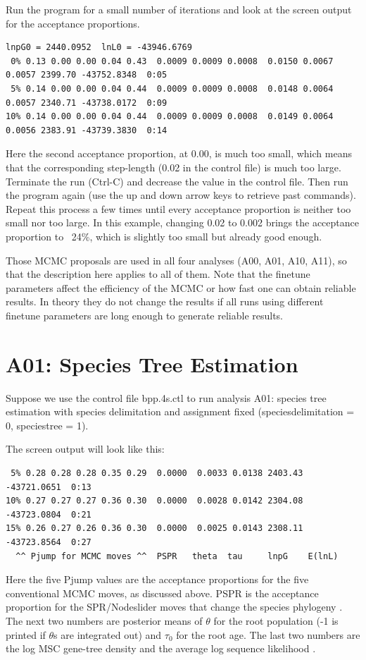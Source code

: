 \documentclass[a4paper]{book}
\numberwithin{equation}{section} \renewcommand{\baselinestretch}{0.55}
\begin{document}
Run the program for a small number of iterations and look at the
screen output for the acceptance proportions.
\begin{verbatim}
lnpG0 = 2440.0952  lnL0 = -43946.6769
 0% 0.13 0.00 0.00 0.04 0.43  0.0009 0.0009 0.0008  0.0150 0.0067 0.0057 2399.70 -43752.8348  0:05
 5% 0.14 0.00 0.00 0.04 0.44  0.0009 0.0009 0.0008  0.0148 0.0064 0.0057 2340.71 -43738.0172  0:09
10% 0.14 0.00 0.00 0.04 0.44  0.0009 0.0009 0.0008  0.0149 0.0064 0.0056 2383.91 -43739.3830  0:14
\end{verbatim}
Here the second acceptance proportion, at 0.00, is much too small,
which means that the corresponding step-length (0.02 in the control
file) is much too large.  Terminate the run (Ctrl-C) and decrease the
value in the control file.  Then run the program again (use the up and
down arrow keys to retrieve past commands).  Repeat this process a few
times until every acceptance proportion is neither too small nor too
large.  In this example, changing 0.02 to 0.002 brings the acceptance
proportion to ~24\%, which is slightly too small but already good
enough.

Those MCMC proposals are used in all four analyses (A00, A01, A10,
A11), so that the description here applies to all of them.  Note that
the finetune parameters affect the efficiency of the MCMC or how fast
one can obtain reliable results.  In theory they do not change the
results if all runs using different finetune parameters are long
enough to generate reliable results.


\section{A01: Species Tree Estimation}

Suppose we use the control file bpp.4s.ctl to run analysis A01:
species tree estimation with species delimitation and assignment fixed
(speciesdelimitation = 0, speciestree = 1).

The screen output will look like this:

\begin{verbatim}
 5% 0.28 0.28 0.28 0.35 0.29  0.0000  0.0033 0.0138 2403.43 -43721.0651  0:13
10% 0.27 0.27 0.27 0.36 0.30  0.0000  0.0028 0.0142 2304.08 -43723.0804  0:21
15% 0.26 0.27 0.26 0.36 0.30  0.0000  0.0025 0.0143 2308.11 -43723.8564  0:27
  ^^ Pjump for MCMC moves ^^  PSPR   theta  tau     lnpG    E(lnL)
\end{verbatim}

Here the five Pjump values are the acceptance proportions for the five
conventional MCMC moves, as discussed above.  PSPR is the acceptance
proportion for the SPR/Nodeslider moves that change the species
phylogeny \cite{Rannala2017}.  The next two numbers are posterior
means of $\theta$ for the root population (-1 is printed if $\theta$s
are integrated out) and $\tau_0$ for the root age.  The last two
numbers are the log MSC gene-tree density \citep{Rannala2003} and the
average log sequence likelihood \cite{Felsenstein1981}.
\end{document}
